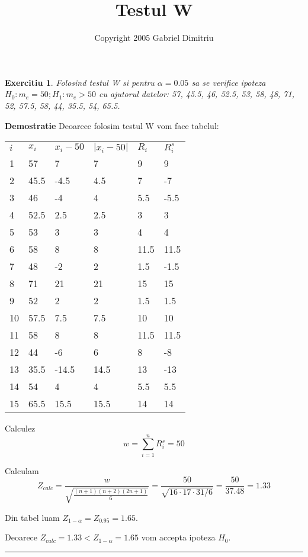 \documentclass{article}
\newtheorem{exercise}[theorem]{Exercitiu}
\newenvironment{proof}[1][Proof]{\noindent\textbf{Demostratie} }{\ \rule{0.5em}{0.5em}}
\begin{document}
\title{Testul W}
\author{Copyright 2005 Gabriel Dimitriu}
\maketitle

\begin{exercise}
Folosind testul W si pentru $\alpha =0.05$ sa se verifice ipoteza $%
H_{0}:m_{e}=50;H_{1}:m_{e}>50$ cu ajutorul datelor: 57, 45.5, 46, 52.5, 53,
58, 48, 71, 52, 57.5, 58, 44, 35.5, 54, 65.5.
\end{exercise}

\begin{proof}
Deoarece folosim testul W vom face tabelul:

\begin{tabular}{llllll}
$i$ & $x_{i}$ & $x_{i}-50$ & $\left\vert x_{i}-50\right\vert $ & $R_{i}$ & $%
R_{i}^{s}$ \\ 
1 & 57 & 7 & 7 & 9 & 9 \\ 
2 & 45.5 & -4.5 & 4.5 & 7 & -7 \\ 
3 & 46 & -4 & 4 & 5.5 & -5.5 \\ 
4 & 52.5 & 2.5 & 2.5 & 3 & 3 \\ 
5 & 53 & 3 & 3 & 4 & 4 \\ 
6 & 58 & 8 & 8 & 11.5 & 11.5 \\ 
7 & 48 & -2 & 2 & 1.5 & -1.5 \\ 
8 & 71 & 21 & 21 & 15 & 15 \\ 
9 & 52 & 2 & 2 & 1.5 & 1.5 \\ 
10 & 57.5 & 7.5 & 7.5 & 10 & 10 \\ 
11 & 58 & 8 & 8 & 11.5 & 11.5 \\ 
12 & 44 & -6 & 6 & 8 & -8 \\ 
13 & 35.5 & -14.5 & 14.5 & 13 & -13 \\ 
14 & 54 & 4 & 4 & 5.5 & 5.5 \\ 
15 & 65.5 & 15.5 & 15.5 & 14 & 14%
\end{tabular}

Calculez%
\[
w=\sum_{i=1}^{n}R_{i}^{s}=50
\]

Calculam%
\[
Z_{calc}=\frac{w}{\sqrt{\frac{(n+1)(n+2)(2n+1)}{6}}}=\frac{50}{\sqrt{16\cdot
17\cdot 31/6}}=\frac{50}{37.48}=1.33
\]

Din tabel luam $Z_{1-\alpha }=Z_{0.95}=1.65$.

Deoarece $Z_{calc}=1.33<Z_{1-\alpha }=1.65$ vom accepta ipoteza $H_{0}$.
\end{proof}
\end{document}
